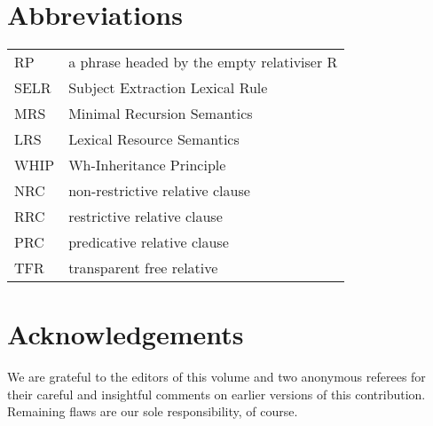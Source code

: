 \documentclass[output=paper
 	        ,biblatex
                ,babelshorthands
                ,newtxmath
                ,draftmode
                ,colorlinks, citecolor=brown
]{langscibook}
\begin{document}

\section*{Abbreviations}

\begin{tabularx}{.99\textwidth}{@{}lX}
RP & a phrase headed by the empty relativiser R\\
SELR & Subject Extraction Lexical Rule         \\            
MRS & Minimal Recursion Semantics              \\            
LRS & Lexical Resource Semantics               \\            
WHIP &  Wh-Inheritance Principle                \\             
NRC & non-restrictive relative clause           \\             
RRC & restrictive relative clause               \\             
PRC & predicative relative clause               \\             
TFR & transparent free relative                 \\             
\end{tabularx}





\section*{Acknowledgements}
We are grateful to the editors of this volume and two anonymous referees for their careful
and insightful comments on earlier versions of this contribution. Remaining flaws are our
sole responsibility, of course.


{\sloppy 
\printbibliography[heading=subbibliography,notkeyword=this] 
}
\end{document}
